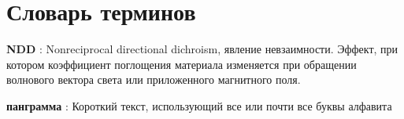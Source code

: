 \chapter*{Словарь терминов}             %

\textbf{NDD} : Nonreciprocal directional dichroism, явление невзаимности. Эффект, при котором коэффициент поглощения материала изменяется при обращении волнового вектора света или приложенного магнитного поля.

\textbf{панграмма} : Короткий текст, использующий все или почти все буквы алфавита
